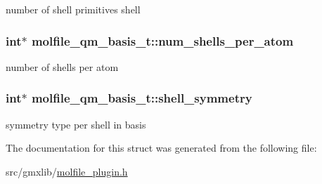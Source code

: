 number of shell primitives shell \hypertarget{structmolfile__qm__basis__t_a899c773945951aeb09cf3b582de7f242}{
\subsubsection[{num\-\_\-shells\-\_\-per\-\_\-atom}]{\setlength{\rightskip}{0pt plus 5cm}int$\ast$ {\bf molfile\-\_\-qm\-\_\-basis\-\_\-t\-::num\-\_\-shells\-\_\-per\-\_\-atom}}}\label{structmolfile__qm__basis__t_a899c773945951aeb09cf3b582de7f242}
number of shells per atom \hypertarget{structmolfile__qm__basis__t_ab8cec531b4200bfe14b5b94dbf79b3f8}{
\subsubsection[{shell\-\_\-symmetry}]{\setlength{\rightskip}{0pt plus 5cm}int$\ast$ {\bf molfile\-\_\-qm\-\_\-basis\-\_\-t\-::shell\-\_\-symmetry}}}\label{structmolfile__qm__basis__t_ab8cec531b4200bfe14b5b94dbf79b3f8}
symmetry type per shell in basis 

\-The documentation for this struct was generated from the following file\-:\begin{DoxyCompactItemize}
\item 
src/gmxlib/\hyperlink{molfile__plugin_8h}{molfile\-\_\-plugin.\-h}\end{DoxyCompactItemize}
